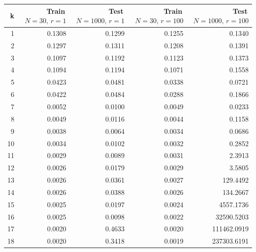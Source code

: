 \begin{tabular}{rrrrr}
\toprule
k & Train\, $N=30,\, r=1$ & Test\, $N=1000,\, r=1$ & Train\, $N=30,\, r=100$ & Test\, $N=1000,\, r=100$ \\
\midrule
1 & 0.1308 & 0.1299 & 0.1255 & 0.1340 \\
2 & 0.1297 & 0.1311 & 0.1208 & 0.1391 \\
3 & 0.1097 & 0.1192 & 0.1123 & 0.1373 \\
4 & 0.1094 & 0.1194 & 0.1071 & 0.1558 \\
5 & 0.0423 & 0.0481 & 0.0338 & 0.0721 \\
6 & 0.0422 & 0.0484 & 0.0288 & 0.1866 \\
7 & 0.0052 & 0.0100 & 0.0049 & 0.0233 \\
8 & 0.0049 & 0.0116 & 0.0044 & 0.1158 \\
9 & 0.0038 & 0.0064 & 0.0034 & 0.0686 \\
10 & 0.0034 & 0.0102 & 0.0032 & 0.2852 \\
11 & 0.0029 & 0.0089 & 0.0031 & 2.3913 \\
12 & 0.0026 & 0.0179 & 0.0029 & 3.5805 \\
13 & 0.0026 & 0.0361 & 0.0027 & 129.4492 \\
14 & 0.0026 & 0.0388 & 0.0026 & 134.2667 \\
15 & 0.0025 & 0.0197 & 0.0024 & 4557.1736 \\
16 & 0.0025 & 0.0098 & 0.0022 & 32590.5203 \\
17 & 0.0020 & 0.4633 & 0.0020 & 111462.0919 \\
18 & 0.0020 & 0.3418 & 0.0019 & 237303.6191 \\
\bottomrule
\end{tabular}
